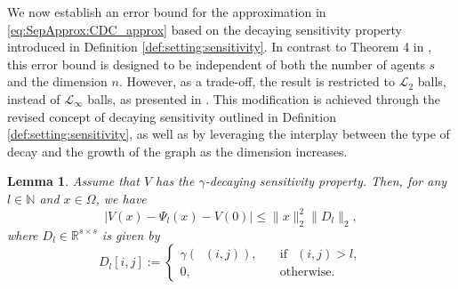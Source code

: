\documentclass{article}
\def\N{\mathbb{N}}
\newcommand{\R}{\mathbb{R}}
\renewcommand{\L}{\mathcal{L}}
\DeclareMathOperator{\distG}{\operatorname{dist_\mathcal{G}}} %
\newtheorem{lemma}{Lemma}[section]
\begin{document}
We now establish an error bound for the approximation in \eqref{eq:SepApprox:CDC_approx} based on the decaying sensitivity property introduced in Definition \ref{def:setting:sensitivity}. In contrast to Theorem 4 in \cite{sperl2023separable},  this error bound is designed to be independent of both the number of agents $s$ and the dimension $n$. However, as a trade-off, the result is restricted to $\L_2$ balls, instead of $\L_\infty$ balls, as presented in \cite[Theorem 4]{sperl2023separable}.  This modification is achieved through the revised concept of decaying sensitivity outlined in Definition \ref{def:setting:sensitivity}, as well as by leveraging the interplay between the type of decay and the growth of the graph as the dimension increases. 
\begin{lemma} \label{lem:SepApprox:QuadraticEstimate}
     Assume that $V$ has the $\gamma$-decaying sensitivity property. Then, for any $l \in \N$ and $x \in \Omega$, we have 
    \begin{equation*}
        \lvert V(x) - \Psi_l(x) - V(0) \rvert \leq \lVert x \rVert_2^2 \lVert D_l \rVert_2, 
    \end{equation*}
    where $D_l \in \R^{s \times s}$ is given by 
    \begin{equation}\label{def.D}
        D_l[i,j] := \begin{cases}
        \gamma({\distG(i,j)}), \quad & \text{if} \, \distG(i,j) > l, \\
       0, \quad & \text{otherwise}. 
    \end{cases}
    \end{equation}
\end{lemma}
\end{document}
